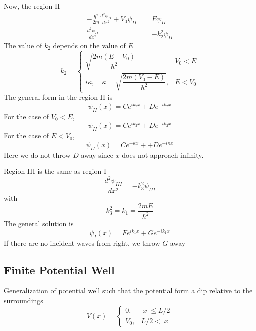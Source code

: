 \documentclass[../../../main.tex]{subfiles}
\begin{document}
Now, the region II
\begin{align*}
    -\frac{\hbar^2}{2m} \frac{d^2 \psi_{II}}{dx^2} + V_0 \psi_{II} & =  E \psi_{II}      \\
    \frac{d^2 \psi_{II}}{dx^2}                                     & = - k_2^2 \psi_{II}
\end{align*}
The value  of $k_2$ depends on the value of $E$
\begin{equation*}
    k_2 =
    \begin{cases}
        \sqrt{\dfrac{2 m (E - V_0)}{\hbar^2}}                           & V_0<E   \\
        i \kappa, \quad \kappa = \sqrt{\dfrac{2 m (V_0 - E)}{\hbar^2}}, & E < V_0
    \end{cases}
\end{equation*}
The general form in the region II is
\begin{equation*}
    \psi_{II}(x)=C e^{i k_2 x} + D e^{-i k_2 x}
\end{equation*}
For the case of $V_0<E$,
\begin{equation*}
    \psi_{II}(x) = C e^{i k_2 x} + D e^{-i k_2 x}
\end{equation*}
For the case of $E<V_0$,
\begin{equation*}
    \psi_{II}(x) =C e^{-\kappa x}+ + D e^{-i\kappa x}
\end{equation*}
Here we do not throw $D$ away since $x$ does not approach infinity.

Region III is the same as region I
\begin{equation*}
    \frac{d^2 \psi_{III}}{dx^2} = - k_3^2 \psi_{III}
\end{equation*}
with
\begin{equation*}
    k_3^2 =k_1=\frac{2 m E}{\hbar^2}
\end{equation*}
The general solution is
\begin{equation*}
    \psi_I(x) = F e^{i k_1 x} + G e^{-i k_1 x}
\end{equation*}
If there are no incident waves from right, we throw $G$ away

\subsection{Finite Potential Well}
Generalization of potential well such that the potential form a dip relative to the surroundings
\begin{equation*}
    V(x)=
    \begin{cases}
        0,   & |x|\leq L/2 \\
        V_0, & L/2 <|x|
    \end{cases}
\end{equation*}
\end{document}
